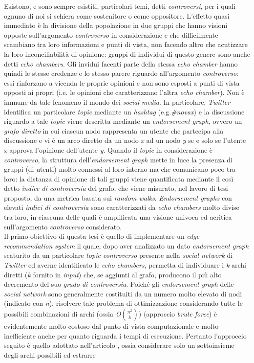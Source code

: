 \documentclass[trieste]{toptesi}
\begin{document}
\sommario
Esistono, e sono sempre esistiti, particolari temi, detti \textit{controversi}, per i quali ognuno di noi si schiera come sostenitore o come oppositore. L'effetto quasi immediato è la divisione della popolazione in due gruppi che hanno visioni opposte sull'argomento \textit{controverso} in considerazione e che difficilmente scambiano tra loro informazioni e punti di vista, non facendo altro che acutizzare la loro inconciliabilità di opinione: gruppi di individui di questo genere sono anche detti \textit{echo chambers}. Gli invidui facenti parte della stessa \textit{echo chamber} hanno quindi le stesse credenze e lo stesso parere riguardo all'argomento \textit{controverso}: essi rinforzano a vicenda le proprie opinioni e non sono esposti a punti di vista opposti ai propri (i.e. le opinioni che caratterizzano l'altra \textit{echo chamber}). Non è immune da tale fenomeno il mondo dei \textit{social media}. In particolare, \textit{Twitter} identifica un particolare \textit{topic} mediante un \textit{hashtag} (e.g.\textit{\#novax}) e la discussione riguardo a tale \textit{topic} viene descritta mediante un \textit{endorsement graph}, ovvero un \textit{grafo diretto} in cui ciascun nodo rappresenta un utente che partecipa alla discussione e vi è un arco diretto da un nodo \textit{x} ad un nodo \textit{y} se e solo se l'utente \textit{x} approva l'opinione dell'utente \textit{y}. Quando il \textit{topic} in considerazione è \textit{controverso}, la struttura dell'\textit{endorsement graph} mette in luce la presenza di gruppi (di utenti) molto connessi al loro interno ma che comunicano poco tra loro: la distanza di opinione di tali gruppi viene quantificata mediante il così detto \textit{indice di controversia} del grafo, che viene misurato, nel lavoro di tesi proposto, da una metrica basata sui \textit{random walks}. \textit{Endorsement graphs} con elevati \textit{indici di controversia} sono caratterizzati da \textit{echo chambers} molto divise tra loro, in ciascuna delle quali è amplificata una visione univoca ed acritica sull'argomento \textit{controverso} considerato. \\Il primo obiettivo di questa tesi è quello di implementare un \textit{edge-recommendation system} il quale, dopo aver analizzato un dato \textit{endorsement graph} scaturito da un particolare \textit{topic controverso} presente nella \textit{social network} di \textit{Twitter} ed averne identificato le \textit{echo chambers}, permetta di individuare i \textit{k} archi diretti (\textit{k} fornito in \textit{input}) che, se aggiunti al grafo, producono il più alto decremento del suo \textit{grado di controversia}. Poiché gli \textit{endorsement graph} delle \textit{social network} sono generalmente costituiti da un numero molto elevato di nodi (indicato con \textit{n}), risolvere tale problema di ottimizzazione considerando tutte le possibili combinazioni di archi (ossia \textit{O}${n^2\choose k}$) (approccio \textit{brute force}) è evidentemente molto costoso dal punto di vista computazionale e molto inefficiente anche per quanto riguarda i tempi di esecuzione. Pertanto l'approccio seguito è quello adottato nell'articolo \cite{famous:paper}, ossia considerare solo un sottoinsieme degli archi possibili ed estrarre 
\end{document}
